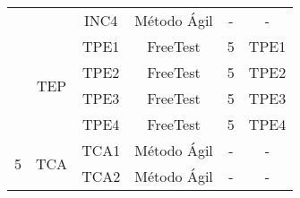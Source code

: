 \begin{table}[H]
{\begin{tabular}{|c|c|c|c|c|c|}
                                                                                      &                                           & INC4                      & Método Ágil                      & -                                                                               & -                                                                                    \\ \cline{2-6} 
                                                                                      & \multirow{4}{*}{TEP}                      & TPE1                      & FreeTest                         & 5                                                                               & TPE1                                                                                 \\ \cline{3-6} 
                                                                                      &                                           & TPE2                      & FreeTest                         & 5                                                                               & TPE2                                                                                 \\ \cline{3-6} 
                                                                                      &                                           & TPE3                      & FreeTest                         & 5                                                                               & TPE3                                                                                 \\ \cline{3-6} 
                                                                                      &                                           & TPE4                      & FreeTest                         & 5                                                                               & TPE4                                                                                 \\ \hline
\multirow{7}{*}{5}                                                                    & \multicolumn{1}{l|}{\multirow{4}{*}{TCA}} & \multicolumn{1}{l|}{TCA1} & \multicolumn{1}{l|}{Método Ágil} & -                                                                               & -                                                                                    \\ \cline{3-6} 
                                                                                      & \multicolumn{1}{l|}{}                     & \multicolumn{1}{l|}{TCA2} & \multicolumn{1}{l|}{Método Ágil} & -                                                                               & -                                                                                    \\ \cline{3-6} 

\end{tabular}}
\end{table}
